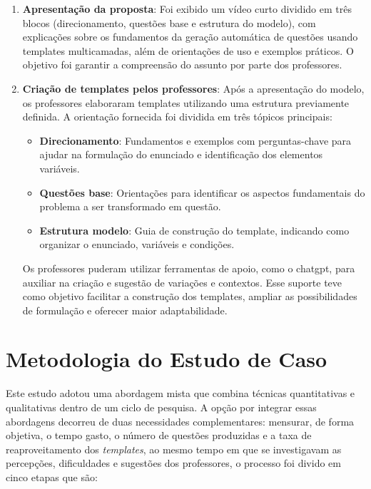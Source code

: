 \begin{enumerate}
    \item \textbf{Apresentação da proposta}: Foi exibido um vídeo curto dividido em três blocos (direcionamento, questões base e estrutura do modelo), com explicações sobre os fundamentos da geração automática de questões usando templates multicamadas, além de orientações de uso e exemplos práticos. O objetivo foi garantir a compreensão do assunto por parte dos professores.

    \item \textbf{Criação de templates pelos professores}: Após a apresentação do modelo, os professores elaboraram templates utilizando uma estrutura previamente definida. A orientação fornecida foi dividida em três tópicos principais:
    \begin{itemize}
        \item \textbf{Direcionamento}: Fundamentos e exemplos com perguntas-chave para ajudar na formulação do enunciado e identificação dos elementos variáveis.
        \item \textbf{Questões base}: Orientações para identificar os aspectos fundamentais do problema a ser transformado em questão.
        \item \textbf{Estrutura modelo}: Guia de construção do template, indicando como organizar o enunciado, variáveis e condições.
    \end{itemize}
    
    Os professores puderam utilizar ferramentas de apoio, como o \gls{chatgpt}, para auxiliar na criação e sugestão de variações e contextos. Esse suporte teve como objetivo facilitar a construção dos templates, ampliar as possibilidades de formulação e oferecer maior adaptabilidade.
\end{enumerate}


\section{Metodologia do Estudo de Caso}

Este estudo adotou uma abordagem mista que combina técnicas quantitativas e qualitativas dentro de um ciclo de pesquisa. A opção por integrar essas abordagens decorreu de duas necessidades complementares: mensurar, de forma objetiva, o tempo gasto, o número de questões produzidas e a taxa de reaproveitamento dos \textit{templates}, ao mesmo tempo em que se investigavam as percepções, dificuldades e sugestões dos professores, o processo foi divido em cinco etapas que são:  

